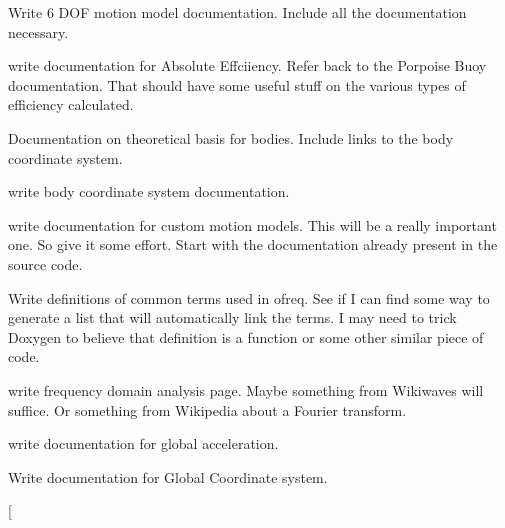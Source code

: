 
\begin{DoxyRefList}
\item[\label{todo__todo000006}%
\hypertarget{todo__todo000006}{}%
Page \hyperlink{sixdof}{6 Degree of Freedom (6 D\-O\-F) Motion Model} ]Write 6 D\-O\-F motion model documentation. Include all the documentation necessary. 
\item[\label{todo__todo000010}%
\hypertarget{todo__todo000010}{}%
Page \hyperlink{efficiency_absolute}{Absolute Efficiency} ]write documentation for Absolute Effciiency. Refer back to the Porpoise Buoy documentation. That should have some useful stuff on the various types of efficiency calculated. 
\item[\label{todo__todo000002}%
\hypertarget{todo__todo000002}{}%
Page \hyperlink{bodies}{Bodies} ]Documentation on theoretical basis for bodies. Include links to the body coordinate system. 
\item[\label{todo__todo000003}%
\hypertarget{todo__todo000003}{}%
Page \hyperlink{body_coordinates}{Body Coordinate System} ]write body coordinate system documentation. 
\item[\label{todo__todo000005}%
\hypertarget{todo__todo000005}{}%
Page \hyperlink{custom_motion_models}{Custom Motion Models} ]write documentation for custom motion models. This will be a really important one. So give it some effort. Start with the documentation already present in the source code. 
\item[\label{todo__todo000049}%
\hypertarget{todo__todo000049}{}%
Page \hyperlink{definitions}{Definitions} ]Write definitions of common terms used in ofreq. See if I can find some way to generate a list that will automatically link the terms. I may need to trick Doxygen to believe that definition is a function or some other similar piece of code. 
\item[\label{todo__todo000039}%
\hypertarget{todo__todo000039}{}%
Page \hyperlink{frequency_domain_analysis}{Frequency Domain Aanalysis} ]write frequency domain analysis page. Maybe something from Wikiwaves will suffice. Or something from Wikipedia about a Fourier transform. 
\item[\label{todo__todo000012}%
\hypertarget{todo__todo000012}{}%
Page \hyperlink{global_acceleration}{Global Acceleration} ]write documentation for global acceleration. 
\item[\label{todo__todo000004}%
\hypertarget{todo__todo000004}{}%
Page \hyperlink{global_coordinates}{Global Coordinates} ]Write documentation for Global Coordinate system. 
\item[\label{todo__todo000013}%

\end{DoxyRefList}
